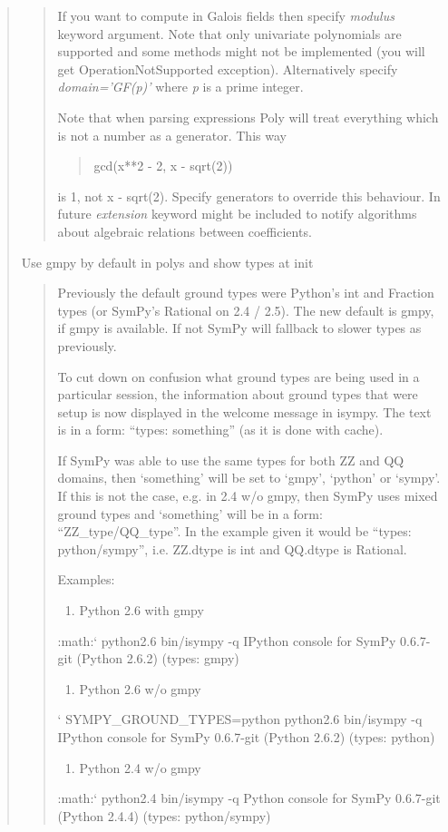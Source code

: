 \begin{quote}
\begin{quote}
If you want to compute in Galois fields then specify \emph{modulus}
keyword argument. Note that only univariate polynomials are
supported and some methods might not be implemented (you will
get OperationNotSupported exception). Alternatively specify
\emph{domain='GF(p)'} where \emph{p} is a prime integer.

Note that when parsing expressions Poly will treat everything
which is not a number as a generator. This way
\begin{quote}

gcd(x**2 - 2, x - sqrt(2))
\end{quote}

is 1, not x - sqrt(2). Specify generators to override this behaviour.
In future \emph{extension} keyword might be included to notify algorithms
about algebraic relations between coefficients.
\end{quote}

Use gmpy by default in polys and show types at init
\begin{quote}

Previously the default ground types were Python's int and Fraction
types (or SymPy's Rational on 2.4 / 2.5). The new default is gmpy,
if gmpy is available. If not SymPy will fallback to slower types
as previously.

To cut down on confusion what ground types are being used in a
particular session, the information about ground types that were
setup is now displayed in the welcome message in isympy. The text
is in a form: ``types: something'' (as it is done with cache).

If SymPy was able to use the same types for both ZZ and QQ domains,
then `something' will be set to `gmpy', `python' or `sympy'. If this
is not the case, e.g. in 2.4 w/o gmpy, then SymPy uses mixed ground
types and `something' will be in a form: ``ZZ\_type/QQ\_type''. In the
example given it would be ``types: python/sympy'', i.e. ZZ.dtype is
int and QQ.dtype is Rational.

Examples:
\begin{enumerate}
\item {} 
Python 2.6 with gmpy

\end{enumerate}

:math:{}` python2.6 bin/isympy -q
IPython console for SymPy 0.6.7-git (Python 2.6.2) (types: gmpy)
\begin{enumerate}
\item {} 
Python 2.6 w/o gmpy

\end{enumerate}

{}` SYMPY\_GROUND\_TYPES=python python2.6 bin/isympy -q
IPython console for SymPy 0.6.7-git (Python 2.6.2) (types: python)
\begin{enumerate}
\item {} 
Python 2.4 w/o gmpy

\end{enumerate}

:math:{}` python2.4 bin/isympy -q
Python console for SymPy 0.6.7-git (Python 2.4.4) (types: python/sympy)
\end{quote}
\end{quote}


